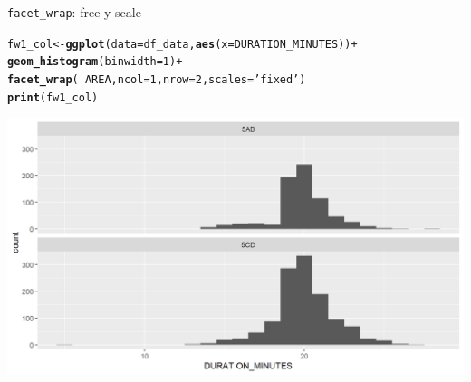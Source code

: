 \documentclass{beamer}\usepackage[]{graphicx}\usepackage[]{color}
\makeatletter
\newcommand{\hlnum}[1]{\textcolor[rgb]{0.686,0.059,0.569}{#1}}%
\newcommand{\hlstr}[1]{\textcolor[rgb]{0.192,0.494,0.8}{#1}}%
\newcommand{\hlopt}[1]{\textcolor[rgb]{0,0,0}{#1}}%
\newcommand{\hlstd}[1]{\textcolor[rgb]{0.345,0.345,0.345}{#1}}%
\newcommand{\hlkwb}[1]{\textcolor[rgb]{0.69,0.353,0.396}{#1}}%
\newcommand{\hlkwc}[1]{\textcolor[rgb]{0.333,0.667,0.333}{#1}}%
\newcommand{\hlkwd}[1]{\textcolor[rgb]{0.737,0.353,0.396}{\textbf{#1}}}%
\newenvironment{kframe}{%
 \def\at@end@of@kframe{}%
 \ifinner\ifhmode%
  \def\at@end@of@kframe{\end{minipage}}%
  \begin{minipage}{\columnwidth}%
 \fi\fi%
 \def\FrameCommand##1{\hskip\@totalleftmargin \hskip-\fboxsep
 \colorbox{shadecolor}{##1}\hskip-\fboxsep
     \hskip-\linewidth \hskip-\@totalleftmargin \hskip\columnwidth}%
 \MakeFramed {\advance\hsize-\width
   \@totalleftmargin\z@ \linewidth\hsize
   \@setminipage}}%
 {\par\unskip\endMakeFramed%
 \at@end@of@kframe}
\newenvironment{knitrout}{}{} %
\makeatother
\begin{document}
\begin{frame}[fragile]{\lstinline{facet_wrap}: free y scale}
\begin{knitrout}\footnotesize
{}\color{fgcolor}\begin{kframe}
\begin{alltt}
\hlstd{fw1_col} \hlkwb{<-} \hlkwd{ggplot}\hlstd{(}\hlkwc{data}\hlstd{=df_data,} \hlkwd{aes}\hlstd{(}\hlkwc{x}\hlstd{=DURATION_MINUTES))} \hlopt{+}
  \hlkwd{geom_histogram}\hlstd{(}\hlkwc{binwidth}\hlstd{=}\hlnum{1}\hlstd{)} \hlopt{+}
  \hlkwd{facet_wrap}\hlstd{(}\hlopt{~} \hlstd{AREA,} \hlkwc{ncol} \hlstd{=} \hlnum{1}\hlstd{,} \hlkwc{nrow} \hlstd{=} \hlnum{2}\hlstd{,} \hlkwc{scales} \hlstd{=} \hlstr{'fixed'}\hlstd{)}
\hlkwd{print}\hlstd{(fw1_col)}
\end{alltt}
\end{kframe}

{\centering \includegraphics[width=.9\linewidth]{figure/facet_wrap_4-1} 

}



\end{knitrout}
\end{frame}
\end{document}
